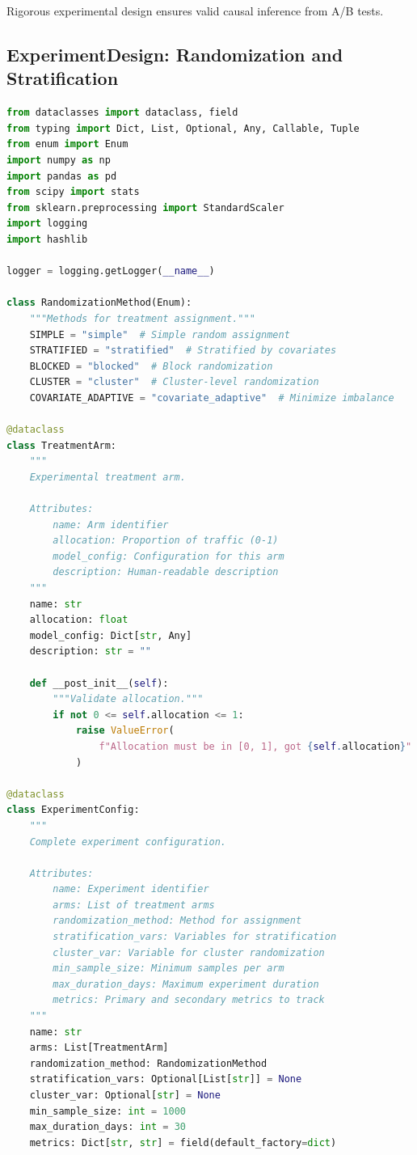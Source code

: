Rigorous experimental design ensures valid causal inference from A/B tests.

\subsection{ExperimentDesign: Randomization and Stratification}

\begin{lstlisting}[language=Python, caption={Comprehensive Experiment Design System}]
from dataclasses import dataclass, field
from typing import Dict, List, Optional, Any, Callable, Tuple
from enum import Enum
import numpy as np
import pandas as pd
from scipy import stats
from sklearn.preprocessing import StandardScaler
import logging
import hashlib

logger = logging.getLogger(__name__)

class RandomizationMethod(Enum):
    """Methods for treatment assignment."""
    SIMPLE = "simple"  # Simple random assignment
    STRATIFIED = "stratified"  # Stratified by covariates
    BLOCKED = "blocked"  # Block randomization
    CLUSTER = "cluster"  # Cluster-level randomization
    COVARIATE_ADAPTIVE = "covariate_adaptive"  # Minimize imbalance

@dataclass
class TreatmentArm:
    """
    Experimental treatment arm.

    Attributes:
        name: Arm identifier
        allocation: Proportion of traffic (0-1)
        model_config: Configuration for this arm
        description: Human-readable description
    """
    name: str
    allocation: float
    model_config: Dict[str, Any]
    description: str = ""

    def __post_init__(self):
        """Validate allocation."""
        if not 0 <= self.allocation <= 1:
            raise ValueError(
                f"Allocation must be in [0, 1], got {self.allocation}"
            )

@dataclass
class ExperimentConfig:
    """
    Complete experiment configuration.

    Attributes:
        name: Experiment identifier
        arms: List of treatment arms
        randomization_method: Method for assignment
        stratification_vars: Variables for stratification
        cluster_var: Variable for cluster randomization
        min_sample_size: Minimum samples per arm
        max_duration_days: Maximum experiment duration
        metrics: Primary and secondary metrics to track
    """
    name: str
    arms: List[TreatmentArm]
    randomization_method: RandomizationMethod
    stratification_vars: Optional[List[str]] = None
    cluster_var: Optional[str] = None
    min_sample_size: int = 1000
    max_duration_days: int = 30
    metrics: Dict[str, str] = field(default_factory=dict)


\end{lstlisting}
